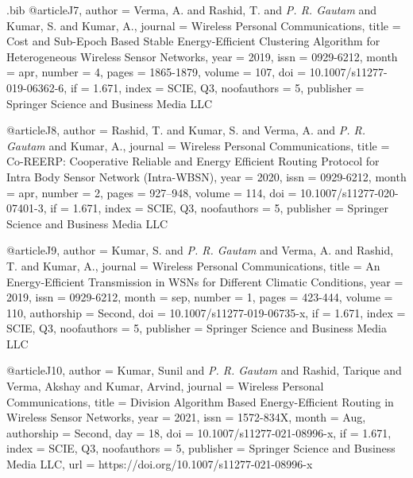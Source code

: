 \begin{filecontents}{\jobname .bib}
@article{J7,
  author      = {Verma, A. and Rashid, T. and \emph{P. R. Gautam} and Kumar, S. and Kumar, A.},
  journal     = {Wireless Personal Communications},
  title       = {Cost and Sub-Epoch Based Stable Energy-Efficient Clustering Algorithm for Heterogeneous Wireless Sensor Networks},
  year        = {2019},
  issn        = {0929-6212},
  month       = {apr},
  number      = {4},
  pages       = {1865-1879},
  volume      = {107},
  doi         = {10.1007/s11277-019-06362-6},
  if          = {1.671},
  index       = {SCIE, Q3},
  noofauthors = {5},
  publisher   = {Springer Science and Business Media {LLC}}
}

@article{J8,
  author      = {Rashid, T. and Kumar, S. and Verma, A. and \emph{P. R. Gautam} and Kumar, A.},
  journal     = {Wireless Personal Communications},
  title       = {Co-REERP: Cooperative Reliable and Energy Efficient Routing Protocol for Intra Body Sensor Network (Intra-WBSN)},
  year        = {2020},
  issn        = {0929-6212},
  month       = {apr},
  number      = {2},
  pages       = {927--948},
  volume      = {114},
  doi         = {10.1007/s11277-020-07401-3},
  if          = {1.671},
  index       = {SCIE, Q3},
  noofauthors = {5},
  publisher   = {Springer Science and Business Media {LLC}}
}

@article{J9,
  author      = {Kumar, S. and \emph{P. R. Gautam} and Verma, A. and Rashid, T. and Kumar, A.},
  journal     = {Wireless Personal Communications},
  title       = {An Energy-Efficient Transmission in WSNs for Different Climatic Conditions},
  year        = {2019},
  issn        = {0929-6212},
  month       = {sep},
  number      = {1},
  pages       = {423-444},
  volume      = {110},
  authorship  = {Second},
  doi         = {10.1007/s11277-019-06735-x},
  if          = {1.671},
  index       = {SCIE, Q3},
  noofauthors = {5},
  publisher   = {Springer Science and Business Media {LLC}}
}

@article{J10,
  author      = {Kumar, Sunil and \emph{P. R. Gautam} and Rashid, Tarique and Verma, Akshay and Kumar, Arvind},
  journal     = {Wireless Personal Communications},
  title       = {Division Algorithm Based Energy-Efficient Routing in Wireless Sensor Networks},
  year        = {2021},
  issn        = {1572-834X},
  month       = {Aug},
  authorship  = {Second},
  day         = {18},
  doi         = {10.1007/s11277-021-08996-x},
  if          = {1.671},
  index       = {SCIE, Q3},
  noofauthors = {5},
  publisher   = {Springer Science and Business Media {LLC}},
  url         = {https://doi.org/10.1007/s11277-021-08996-x}
}


\end{filecontents}
